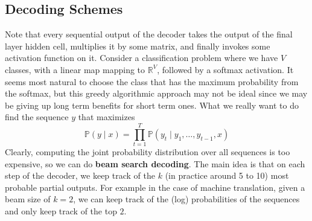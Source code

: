 \documentclass{article}
\begin{document}
  \subsection{Decoding Schemes}

    Note that every sequential output of the decoder takes the output of the final layer hidden cell, multiplies it by some matrix, and finally invokes some activation function on it. Consider a classification problem where we have $V$ classes, with a linear map mapping to $\mathbb{R}^{V}$, followed by a softmax activation. It seems most natural to choose the class that has the maximum probability from the softmax, but this greedy algorithmic approach may not be ideal since we may be giving up long term benefits for short term ones. What we really want to do find the sequence $y$ that maximizes 
    \[\mathbb{P}(y \mid x) = \prod_{t=1}^T \mathbb{P}( y_t \mid y_{1}, \ldots, y_{t-1}, x)\]
    Clearly, computing the joint probability distribution over all sequences is too expensive, so we can do \textbf{beam search decoding}. The main idea is that on each step of the decoder, we keep track of the $k$ (in practice around 5 to 10) most probable partial outputs. For example in the case of machine translation, given a beam size of $k = 2$, we can keep track of the (log) probabilities of the sequences and only keep track of the top $2$. 
\end{document}
